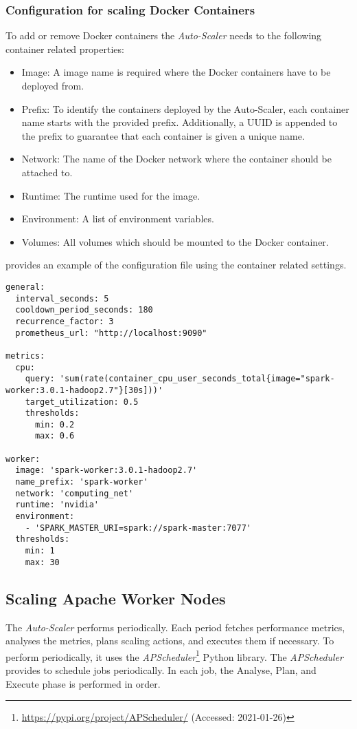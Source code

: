 \subsubsection{Configuration for scaling Docker Containers}
%
To add or remove Docker containers the \textit{Auto-Scaler} needs to the following container related properties:
\begin{itemize}
\item Image: A image name is required where the Docker containers have to be deployed from.

\item Prefix: To identify the containers deployed by the Auto-Scaler, each container name starts with the provided prefix. Additionally, a UUID is appended to the prefix to guarantee that each container is given a unique name.

\item Network: The name of the Docker network where the container should be attached to.

\item Runtime: The runtime used for the image.

\item Environment: A list of environment variables.

\item Volumes: All volumes which should be mounted to the Docker container.
\end{itemize}
 provides an example of the configuration file using the container related settings. 
\begin{lstlisting}[label=lst:06_auto-scaler_config_container_example, caption=\textit{Auto-Scaler} configuration for scaling Docker Containers]
general:
  interval_seconds: 5
  cooldown_period_seconds: 180
  recurrence_factor: 3
  prometheus_url: "http://localhost:9090"
 
metrics:
  cpu:
    query: 'sum(rate(container_cpu_user_seconds_total{image="spark-worker:3.0.1-hadoop2.7"}[30s]))'
    target_utilization: 0.5
    thresholds:
      min: 0.2
      max: 0.6
 
worker:
  image: 'spark-worker:3.0.1-hadoop2.7'
  name_prefix: 'spark-worker'
  network: 'computing_net'
  runtime: 'nvidia'
  environment:
    - 'SPARK_MASTER_URI=spark://spark-master:7077'
  thresholds:
    min: 1
    max: 30
\end{lstlisting}


\subsection{Scaling Apache Worker Nodes}
The \textit{Auto-Scaler} performs periodically. Each period fetches performance metrics, analyses the metrics, plans scaling actions, and executes them if necessary.
To perform periodically, it uses the \textit{APScheduler}\footnote{\url{https://pypi.org/project/APScheduler/} (Accessed: 2021-01-26)} Python library. The \textit{APScheduler} provides to schedule jobs periodically.
In each job, the Analyse, Plan, and Execute phase is performed in order.


